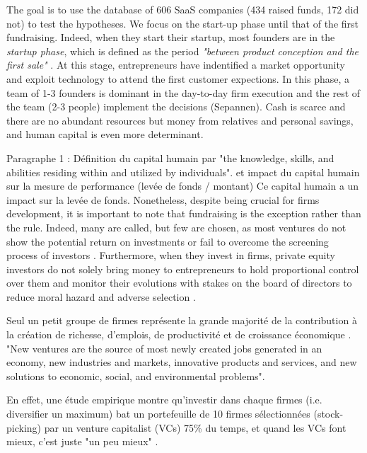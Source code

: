 \documentclass[12pt]{article}
\begin{document}
The goal is to use the database of 606 SaaS companies (434 raised funds, 172 did not) to test the hypotheses. We focus on the start-up phase until that of the first fundraising. Indeed, when they start their startup, most founders are in the \textit{startup phase}, which is defined as the period \textit{"between product conception and the first sale"} \citep{crowne2002software}. At this stage, entrepreneurs have indentified a market opportunity and exploit technology to attend the first customer expections. In this phase, a team of 1-3 founders is dominant in the day-to-day firm execution and the rest of the team (2-3 people) implement the decisions (Sepannen). Cash is scarce and there are no abundant resources but money from relatives and personal savings, and human capital is even more determinant.

Paragraphe 1 : Définition du capital humain par \citep{becker1964human} "the knowledge, skills, and abilities residing within and utilized by individuals". et impact du capital humain sur la mesure de performance (levée de fonds / montant) Ce capital humain a un impact sur la levée de fonds. Nonetheless, despite being crucial for firms development, it is important to note that fundraising is the exception rather than the rule. Indeed, many are called, but few are chosen, as most ventures do not show the potential return on investments or fail to overcome the screening process of investors \citep{huang2017growing}. Furthermore, when they invest in firms, private equity investors do not solely bring money to entrepreneurs to hold proportional control over them and monitor their evolutions with stakes on the board of directors to reduce moral hazard and adverse selection \citep{bertoni2011venture}.

Seul un petit groupe de firmes représente la grande majorité de la contribution à la création de richesse, d'emplois, de productivité et de croissance économique \citep{autio2016entrepreneurship}. "New ventures are the source of most newly created jobs generated in an economy, new industries and markets, innovative products and services, and new solutions to economic, social, and environmental problems".

En effet, une étude empirique montre qu'investir dans chaque firmes (i.e. diversifier un maximum) bat un portefeuille de 10 firmes sélectionnées (stock-picking) par un venture capitalist (VCs) 75\% du temps, et quand les VCs font mieux, c'est juste "un peu mieux" \citep{othman2020angelistdata}.
\end{document}
